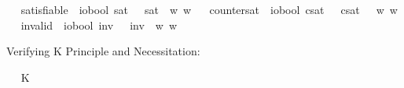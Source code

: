 \begin{isabellebody}
\ \isamarkupfalse%
\ satisfiable\ {\isacharcolon}{\isacharcolon}\ {\isachardoublequoteopen}io{\isasymRightarrow}bool{\isachardoublequoteclose}\ {\isacharparenleft}{\isachardoublequoteopen}{\isasymlfloor}{\isacharunderscore}{\isasymrfloor}\isactrlsup s\isactrlsup a\isactrlsup t{\isachardoublequoteclose}\ {\isacharbrackleft}{}{\isacharbrackright}{\isacharparenright}\ \ {\isachardoublequoteopen}{\isasymlfloor}{\isasympsi}{\isasymrfloor}\isactrlsup s\isactrlsup a\isactrlsup t\ {\isasymequiv}\ {\isasymexists}w{\isachardot}{\isacharparenleft}{\isasympsi}\ w{\isacharparenright}{\isachardoublequoteclose}\isanewline
\ \isamarkupfalse%
\ countersat\ {\isacharcolon}{\isacharcolon}\ {\isachardoublequoteopen}io{\isasymRightarrow}bool{\isachardoublequoteclose}\ {\isacharparenleft}{\isachardoublequoteopen}{\isasymlfloor}{\isacharunderscore}{\isasymrfloor}\isactrlsup c\isactrlsup s\isactrlsup a\isactrlsup t{\isachardoublequoteclose}\ {\isacharbrackleft}{}{\isacharbrackright}{\isacharparenright}\ \ {\isachardoublequoteopen}{\isasymlfloor}{\isasympsi}{\isasymrfloor}\isactrlsup c\isactrlsup s\isactrlsup a\isactrlsup t\ {\isasymequiv}\ \ {\isasymexists}w{\isachardot}{\isasymnot}{\isacharparenleft}{\isasympsi}\ w{\isacharparenright}{\isachardoublequoteclose}\isanewline
\ \isamarkupfalse%
\ invalid\ {\isacharcolon}{\isacharcolon}\ {\isachardoublequoteopen}io{\isasymRightarrow}bool{\isachardoublequoteclose}\ {\isacharparenleft}{\isachardoublequoteopen}{\isasymlfloor}{\isacharunderscore}{\isasymrfloor}\isactrlsup i\isactrlsup n\isactrlsup v{\isachardoublequoteclose}\ {\isacharbrackleft}{}{\isacharbrackright}{\isacharparenright}\ \ {\isachardoublequoteopen}{\isasymlfloor}{\isasympsi}{\isasymrfloor}\isactrlsup i\isactrlsup n\isactrlsup v\ {\isasymequiv}\ {\isasymforall}w{\isachardot}{\isasymnot}{\isacharparenleft}{\isasympsi}\ w{\isacharparenright}{\isachardoublequoteclose}%
\isamarkuptrue%
%
\begin{isamarkuptext}%
Verifying K Principle and Necessitation:%
\end{isamarkuptext}\isamarkuptrue%
\ \isamarkupfalse%
\ K{\isacharcolon}\ {\isachardoublequoteopen}{\isasymlfloor}{\isacharparenleft}\isactrlbold {\isasymbox}{\isacharparenleft}{\isasymphi}\ \isactrlbold {\isasymrightarrow}\ {\isasympsi}{\isacharparenright}{\isacharparenright}\ \isactrlbold {\isasymrightarrow}\ {\isacharparenleft}\isactrlbold {\isasymbox}{\isasymphi}\ \isactrlbold {\isasymrightarrow}\ \isactrlbold {\isasymbox}{\isasympsi}{\isacharparenright}{\isasymrfloor}{\isachardoublequoteclose}%

\end{isabellebody}
